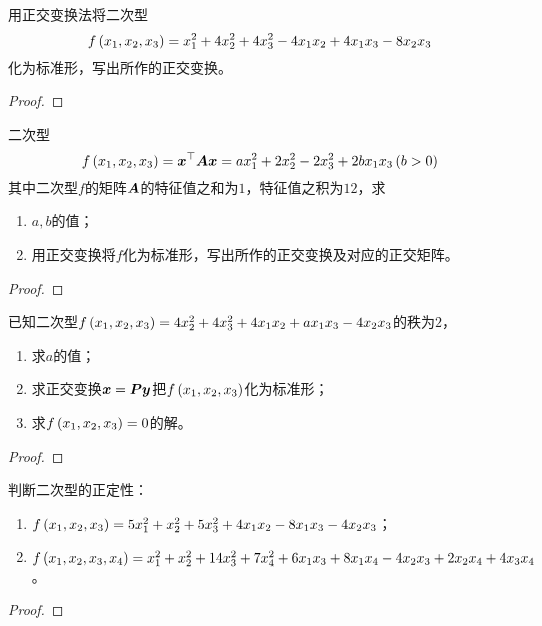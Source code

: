 \begin{problem}
用正交变换法将二次型
\begin{equation*}
    f\left( x_1,x_2,x_3 \right)=x_1^2+4x_2^2+4x_3^2-4x_1x_2+4x_1x_3-8x_2x_3
\end{equation*}
化为标准形，写出所作的正交变换。
\end{problem}
\begin{proof}

\end{proof}

\begin{problem}
二次型
\begin{equation*}
    f\left( x_1,x_2,x_3 \right)=\boldsymbol{x}^\top\boldsymbol{A}\boldsymbol{x}=ax_1^2+2x_2^2-2x_3^2+2bx_1x_3\left( b>0 \right)
\end{equation*}
其中二次型\(f\)的矩阵\(\boldsymbol{A}\)的特征值之和为\(1\)，特征值之积为\(12\)，求
\begin{enumerate}
    \item \(a,b\)的值；
    \item 用正交变换将\(f\)化为标准形，写出所作的正交变换及对应的正交矩阵。
\end{enumerate}
\end{problem}
\begin{proof}

\end{proof}

\setcounter{problem}{37}
\begin{problem}
已知二次型\(f\left( x_1,x_2,x_3 \right)=4x_2^2+4x_3^2+4x_1x_2+ax_1x_3-4x_2x_3\)的秩为\(2\)，
\begin{enumerate}
    \item 求\(a\)的值；
    \item 求正交变换\(\boldsymbol{x}=\boldsymbol{P}\boldsymbol{y}\)把\(f\left( x_1,x_2,x_3 \right)\)化为标准形；
    \item 求\(f\left( x_1,x_2,x_3 \right)=0\)的解。
\end{enumerate}
\end{problem}
\begin{proof}

\end{proof}

\begin{problem}
判断二次型的正定性：
\begin{enumerate}
    \item \(f\left( x_1,x_2,x_3 \right)=5x_1^2+x_2^2+5x_3^2+4x_1x_2-8x_1x_3-4x_2x_3\)；
    \item \(f\left( x_1,x_2,x_3,x_4 \right)=x_1^2+x_2^2+14x_3^2+7x_4^2+6x_1x_3+8x_1x_4-4x_2x_3+2x_2x_4+4x_3x_4\)。
\end{enumerate}
\end{problem}
\begin{proof}

\end{proof}


